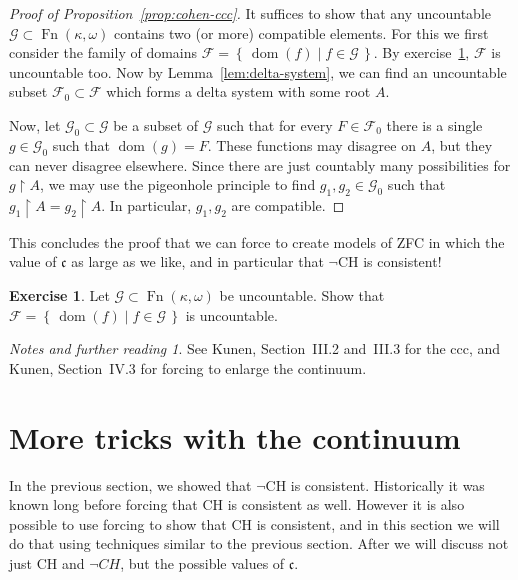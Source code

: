 \documentclass[11pt,oneside]{amsbook}
\newcommand{\set}[1]{\left\{\,#1\,\right\}}
\DeclareMathOperator{\dom}{dom}
\DeclareMathOperator{\Fn}{Fn}
\theoremstyle{definition}
\newtheorem{exercise}{Exercise}[section]
\theoremstyle{plain}
\theoremstyle{definition}
\theoremstyle{remark}
\newtheorem*{notes}{Notes and further reading}
\numberwithin{equation}{section}
\numberwithin{figure}{section}
\begin{document}
\begin{proof}[Proof of Proposition~\ref{prop:cohen-ccc}]
  It suffices to show that any uncountable $\mathcal G\subset\Fn(\kappa,\omega)$ contains two (or more) compatible elements. For this we first consider the family of domains $\mathcal F=\set{\dom(f)\mid f\in\mathcal G}$. By exercise~\ref{ex:domuncountable}, $\mathcal F$ is uncountable too. Now by Lemma~\ref{lem:delta-system}, we can find an uncountable subset $\mathcal F_0\subset\mathcal F$ which forms a delta system with some root $A$.

  Now, let $\mathcal G_0\subset\mathcal G$ be a subset of $\mathcal G$ such that for every $F\in\mathcal F_0$ there is a single $g\in\mathcal G_0$ such that $\dom(g)=F$. These functions may disagree on $A$, but they can never disagree elsewhere. Since there are just countably many possibilities for $g\restriction A$, we may use the pigeonhole principle to find $g_1,g_2\in\mathcal G_0$ such that $g_1\restriction A=g_2\restriction A$. In particular, $g_1,g_2$ are compatible.
\end{proof}

This concludes the proof that we can force to create models of ZFC in which the value of $\mathfrak c$ as large as we like, and in particular that $\neg$CH is consistent!

\begin{exercise}
  \label{ex:domuncountable}
  Let $\mathcal G\subset\Fn(\kappa,\omega)$ be uncountable. Show that $\mathcal F=\set{\dom(f)\mid f\in\mathcal G}$ is uncountable.
\end{exercise}

\begin{notes}
  See Kunen, Section~III.2 and~III.3 for the ccc, and Kunen, Section~IV.3 for forcing to enlarge the continuum.
\end{notes}


\newpage
\section{More tricks with the continuum}

In the previous section, we showed that $\neg$CH is consistent. Historically it was known long before forcing that CH is consistent as well. However it is also possible to use forcing to show that CH is consistent, and in this section we will do that using techniques similar to the previous section. After we will discuss not just CH and $\neg CH$, but the possible values of $\mathfrak c$.
\end{document}

